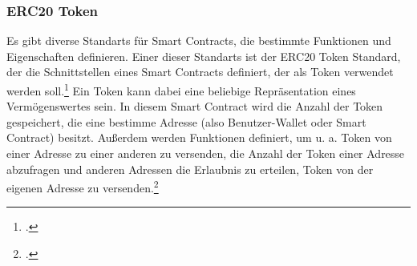 \subsubsection{ERC20 Token}
\label{sec:definition-erc20-token}
Es gibt diverse Standarts für Smart Contracts, die bestimmte Funktionen und Eigenschaften definieren.
Einer dieser Standarts ist der ERC20 Token Standard, der die Schnittstellen eines Smart Contracts definiert, der als Token verwendet werden soll.\footcite[Vgl. hierzu und im Folgenden][]{w7}
Ein Token kann dabei eine beliebige Repräsentation eines Vermögenswertes sein.
In diesem Smart Contract wird die Anzahl der Token gespeichert, die eine bestimme Adresse (also Benutzer-Wallet oder Smart Contract) besitzt.
Außerdem werden Funktionen definiert, um u. a. Token von einer Adresse zu einer anderen zu versenden, die Anzahl der Token einer Adresse abzufragen und anderen Adressen die Erlaubnis zu erteilen, Token von der eigenen Adresse zu versenden.\footcites[Vgl.][]{w8}[]{w7}
